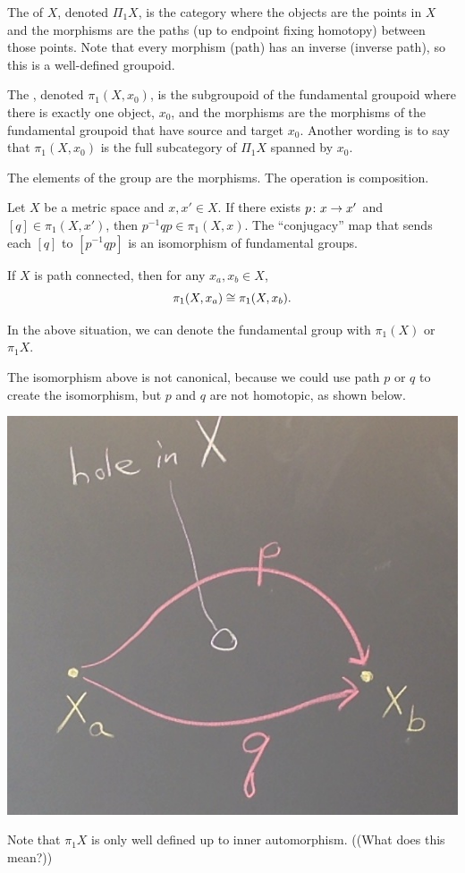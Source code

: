 \documentclass[11pt,leqno,oneside]{amsart}
\numberwithin{thm}{section}
\newcommand{\fund}[1][1]{\pi_{#1}}
\begin{document}
\begin{defn}
  The  of $X$, denoted $\Pi_1 X$, is the
  category where the objects are the points in $X$ and the morphisms
  are the paths (up to endpoint fixing homotopy) between those points.  Note that every morphism (path) has an inverse (inverse path), so this is a well-defined groupoid.
\end{defn}
\begin{defn}
  The , denoted
  $\fund(X, x_0)$, is the subgroupoid of the fundamental groupoid
  where there is exactly one object, $x_0$, and the morphisms are the
  morphisms of the fundamental groupoid that have source and target
  $x_0$.  Another wording is to say that $\fund(X, x_0)$ is the full
  subcategory of $\Pi_1 X$ spanned by $x_0$.

  The elements of the group are the morphisms.  The operation is
  composition.
\end{defn}
\begin{thm}[Hatcher 1.5]
  Let $X$ be a metric space and $x,x' \in X$.  If there exists
  $p\colon x \to x'$ and $[q] \in \fund(X,x')$, then
  $p^{-1}qp \in \fund(X,x)$.  The ``conjugacy'' map that sends each $[q]$ to $[p^{-1}qp]$ is an isomorphism of fundamental groups.
\end{thm}
\begin{thm}
  If $X$ is path connected, then for any $x_a, x_b \in X$,
  $$\fund(X, x_a) \isom \fund(X, x_b).$$
\end{thm}
In the above situation, we can denote the fundamental
group with $\fund(X)$ or $\fund X$.
\begin{example}
  The isomorphism above is not canonical, because we could use path $p$ or $q$ to create the isomorphism, but $p$ and $q$ are not homotopic, as shown below.

  \includegraphics[scale=0.2]{images/isomorphism-not-canonical}

  Note that $\fund X$ is only well defined up to inner automorphism.  ((What does this mean?))
\end{example}
\end{document}
